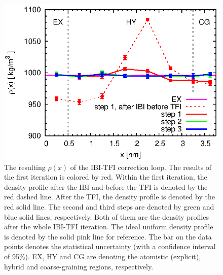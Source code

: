 \documentclass[aps,pre,preprint,unsortedaddress]{revtex4}
\begin{document}
\begin{figure}
  \centering
  \includegraphics{fig.2/rho.eps}
  \caption{The resulting $\rho(x)$ of the IBI-TFI correction loop.
    The results of the first iteration is colored by red. Within the
    first iteration, the density profile after the IBI and before the
    TFI is denoted by the  red dashed line.  After the TFI, the density
    profile is denoted by the  red solid line.  The second and third
    steps are denoted by green and blue solid lines,
    respectively. Both of them are the density profiles after the
    whole IBI-TFI iteration. The ideal uniform density profile is
    denoted by the solid pink line for reference. The bar on the data
    points denotes the statistical uncertainty (with a confidence
    interval of 95\%). EX, HY and CG are denoting the atomistic
    (explicit), hybrid and coarse-graining regions, respectively. }
  \label{fig:tmp3}
\end{figure}
\end{document}
